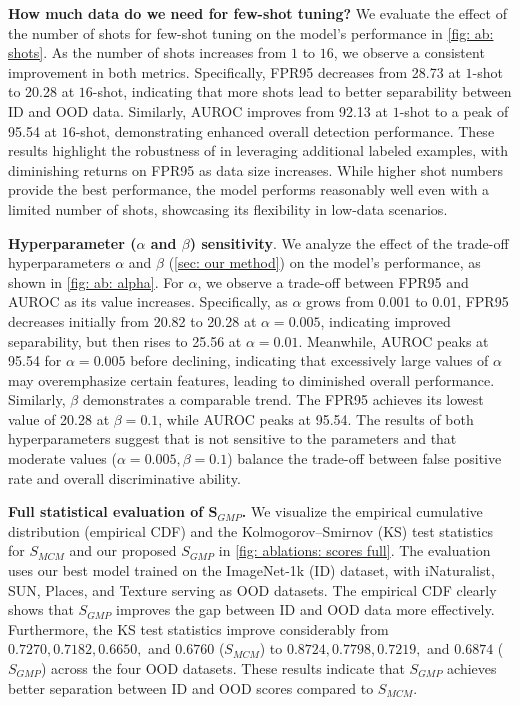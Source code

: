 \noindent
\textbf{How much data do we need for few-shot tuning?}
We evaluate the effect of the number of shots for few-shot tuning on the model's performance in \cref{fig: ab: shots}. 
As the number of shots increases from \(1\) to \(16\), we observe a consistent improvement in both metrics. Specifically, FPR95 decreases from 28.73 at \(1\)-shot to 20.28 at \(16\)-shot, indicating that more shots lead to better separability between ID and OOD data. 
Similarly, AUROC improves from 92.13 at \(1\)-shot to a peak of 95.54 at \(16\)-shot, demonstrating enhanced overall detection performance. 
These results highlight the robustness of \ours in leveraging additional labeled examples, with diminishing returns on FPR95 as data size increases. 
While higher shot numbers provide the best performance, the model performs reasonably well even with a limited number of shots, showcasing its flexibility in low-data scenarios.

\noindent
\textbf{Hyperparameter ($\alpha$ and $\beta$) sensitivity}.  
We analyze the effect of the trade-off hyperparameters $\alpha$ and $\beta$ (\cref{sec: our method}) on the model's performance, as shown in \cref{fig: ab: alpha}. 
For $\alpha$, we observe a trade-off between FPR95 and AUROC as its value increases. 
Specifically, as $\alpha$ grows from 0.001 to 0.01, FPR95 decreases initially from 20.82 to 20.28 at $\alpha = 0.005$, indicating improved separability, but then rises to 25.56 at $\alpha = 0.01$. 
Meanwhile, AUROC peaks at 95.54 for $\alpha = 0.005$ before declining, indicating that excessively large values of $\alpha$ may overemphasize certain features, leading to diminished overall performance.  
Similarly, $\beta$ demonstrates a comparable trend. The FPR95 achieves its lowest value of 20.28 at $\beta = 0.1$, while AUROC peaks at 95.54. 
The results of both hyperparameters suggest that \ours is not sensitive to the parameters and that moderate values ($\alpha = 0.005, \beta = 0.1$) balance the trade-off between false positive rate and overall discriminative ability.

\noindent
\textbf{Full statistical evaluation of $\pmb{S_{\textit{GMP}}}$.} 
We visualize the empirical cumulative distribution (empirical CDF) and the Kolmogorov–Smirnov (KS) test statistics for \( S_{\textit{MCM}} \) and our proposed \( S_{\textit{GMP}} \) in \cref{fig: ablations: scores full}.  
The evaluation uses our best model trained on the ImageNet-1k (ID) dataset, with iNaturalist, SUN, Places, and Texture serving as OOD datasets.  
The empirical CDF clearly shows that \( S_{\textit{GMP}} \) improves the gap between ID and OOD data more effectively.  
Furthermore, the KS test statistics improve considerably from \( 0.7270, 0.7182, 0.6650, \) and \( 0.6760 \) (\( S_{\textit{MCM}} \)) to \( 0.8724, 0.7798, 0.7219, \) and \( 0.6874 \) (\( S_{\textit{GMP}} \)) across the four OOD datasets. 
These results indicate that \( S_{\textit{GMP}} \) achieves better separation between ID and OOD scores compared to \( S_{\textit{MCM}} \).





